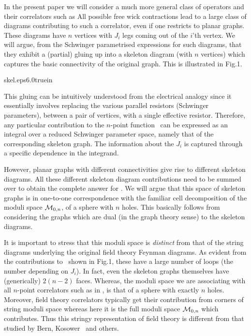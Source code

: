 In the present paper we will consider a much more general class of
operators and their correlators such as 
\eqn{}
All possible free wick contractions lead to a large class of diagrams
contributing to such a correlator, even if one restricts to planar graphs.
These diagrams have $n$ vertices
with $J_i$ legs coming out of the $i$'th vertex.
We will argue, from the Schwinger parametrised expressions
for such diagrams, that they exhibit a (partial) gluing up into
a skeleton diagram (with $n$ vertices)
which captures the basic connectivity of the original
graph. This is illustrated in Fig.1.

%
{skel.eps}{6.0truein}
%

This gluing can be intuitively understood from the electrical
analogy since it essentially involves replacing the various parallel
resistors (Schwinger parameters), between a pair of vertices, with
a single effective resistor. Therefore, any particular
contribution to the $n$-point function \ncorr\ can be expressed as
an integral over a reduced Schwinger parameter space, namely that
of the corresponding skeleton graph. The information about the
$J_i$ is captured through a specific dependence in the integrand.

However, planar graphs with different connectivities give rise to
different skeleton diagrams. All these different skeleton diagram
contributions need to be summed over to obtain the complete
answer for \ncorr . We will argue that this space of skeleton
graphs is in one-to-one correspondence with the familiar cell
decomposition of the moduli space ${\cal M}_{0,n}$, of a sphere
with $n$ holes. This basically follows from considering the graphs
which are dual (in the graph theory sense) to the skeleton
diagrams.

It is important to stress that this moduli space is {\it distinct}
from that of the string diagrams underlying the original field
theory Feynman diagrams. As evident from the contributions to
\ncorr\ shown in Fig.1, these have a large number of loops (the
number depending on $J_i$). In fact, even the skeleton graphs
themselves have (generically) $2(n-2)$ faces. Whereas, the moduli
space we are associating with all $n$-point correlators such as in
\ncorr , is that of a sphere with exactly $n$ holes. Moreover,
field theory correlators typically get their contribution from
corners of string moduli space whereas here it is the full
moduli space ${\cal M}_{0,n}$ which contributes. Thus this stringy 
representation of field theory
is different from that studied by Bern, Kosower \berkos\
and others.

